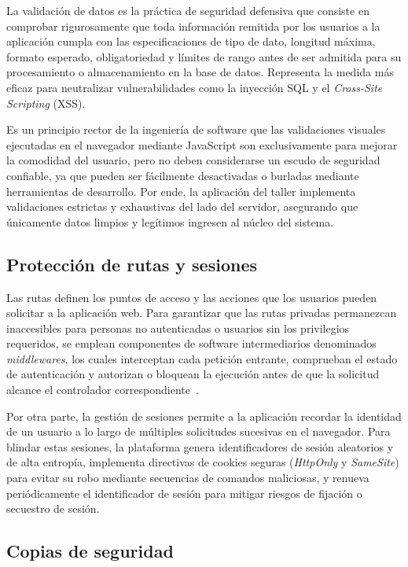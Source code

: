 La validación de datos es la práctica de seguridad defensiva que consiste en comprobar rigurosamente que toda información remitida por los usuarios a la aplicación cumpla con las especificaciones de tipo de dato, longitud máxima, formato esperado, obligatoriedad y límites de rango antes de ser admitida para su procesamiento o almacenamiento en la base de datos. Representa la medida más eficaz para neutralizar vulnerabilidades como la inyección SQL y el \textit{Cross-Site Scripting} (XSS).

Es un principio rector de la ingeniería de software que las validaciones visuales ejecutadas en el navegador mediante JavaScript son exclusivamente para mejorar la comodidad del usuario, pero no deben considerarse un escudo de seguridad confiable, ya que pueden ser fácilmente desactivadas o burladas mediante herramientas de desarrollo. Por ende, la aplicación del taller implementa validaciones estrictas y exhaustivas del lado del servidor, asegurando que únicamente datos limpios y legítimos ingresen al núcleo del sistema.

\subsection{Protección de rutas y sesiones}

Las rutas definen los puntos de acceso y las acciones que los usuarios pueden solicitar a la aplicación web. Para garantizar que las rutas privadas permanezcan inaccesibles para personas no autenticadas o usuarios sin los privilegios requeridos, se emplean componentes de software intermediarios denominados \textit{middlewares}, los cuales interceptan cada petición entrante, comprueban el estado de autenticación y autorizan o bloquean la ejecución antes de que la solicitud alcance el controlador correspondiente~\cite{laravel_doc, laravel_authentication}.

Por otra parte, la gestión de sesiones permite a la aplicación recordar la identidad de un usuario a lo largo de múltiples solicitudes sucesivas en el navegador. Para blindar estas sesiones, la plataforma genera identificadores de sesión aleatorios y de alta entropía, implementa directivas de cookies seguras (\textit{HttpOnly} y \textit{SameSite}) para evitar su robo mediante secuencias de comandos maliciosas, y renueva periódicamente el identificador de sesión para mitigar riesgos de fijación o secuestro de sesión.

\subsection{Copias de seguridad}

